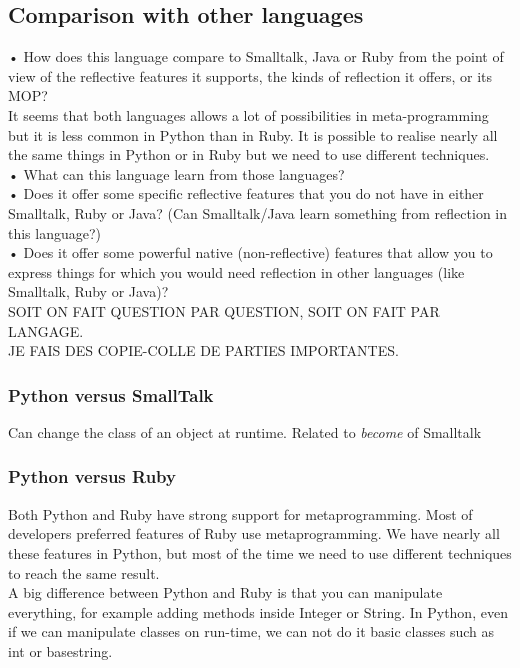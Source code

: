 \subsection{Comparison with other languages}
•	How does this language compare to Smalltalk, Java or Ruby from the point of view of the reflective features it supports, the kinds of reflection it offers, or its MOP?\\
It seems that both languages allows a lot of possibilities in meta-programming but it is less common in Python than in Ruby. It is possible to realise nearly all the same things in Python or in Ruby but we need to use different techniques.\\

•	What can this language learn from those languages?\\
•	Does it offer some specific reflective features that you do not have in either Smalltalk, Ruby or Java? (Can Smalltalk/Java learn something from reflection in this language?)\\
•	Does it offer some powerful native (non-reflective) features that allow you to express things for which you would need reflection in other languages (like Smalltalk, Ruby or Java)?\\

SOIT ON FAIT QUESTION PAR QUESTION, SOIT ON FAIT PAR LANGAGE.\\
JE FAIS DES COPIE-COLLE DE PARTIES IMPORTANTES.\\
\subsubsection{Python versus SmallTalk}
Can change the class of an object at runtime. Related to \emph{become} of Smalltalk

\subsubsection{Python versus Ruby}
\label{ruby_vs_python}
Both Python and Ruby have strong support for metaprogramming. 
Most of developers preferred features of Ruby use metaprogramming. 
We have nearly all these features in Python, but most of the time we need to use different techniques to reach the same result.\\

A big difference between Python and Ruby is that you can manipulate everything, for example adding methods inside Integer or String. In Python, even if we can manipulate classes on run-time, we can not do it basic classes such as int or basestring.\\


